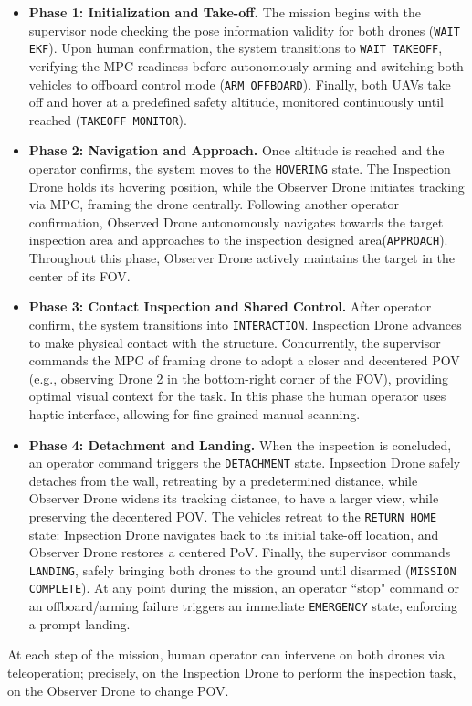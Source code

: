 \begin{itemize}
    \item \textbf{Phase 1: Initialization and Take-off.} The mission begins with the supervisor node checking the pose information validity for both drones (\texttt{WAIT EKF}). Upon human confirmation, the system transitions to \texttt{WAIT TAKEOFF}, verifying the MPC readiness before autonomously arming and switching both vehicles to offboard control mode (\texttt{ARM OFFBOARD}). Finally, both UAVs take off and hover at a predefined safety altitude, monitored continuously until reached (\texttt{TAKEOFF MONITOR}). 
    \item \textbf{Phase 2: Navigation and Approach.} Once altitude is reached and the operator confirms, the system moves to the \texttt{HOVERING} state. The Inspection Drone holds its hovering position, while the Observer Drone initiates tracking via MPC, framing the drone centrally. Following another operator confirmation, Observed Drone autonomously navigates towards the target inspection area and approaches to the inspection designed area(\texttt{APPROACH}). Throughout this phase, Observer Drone actively maintains the target in the center of its FOV.
    \item \textbf{Phase 3: Contact Inspection and Shared Control.} After operator confirm, the system transitions into \texttt{INTERACTION}. Inspection Drone advances to make physical contact with the structure. Concurrently, the supervisor commands the MPC of framing drone to adopt a closer and decentered POV (e.g., observing Drone 2 in the bottom-right corner of the FOV), providing optimal visual context for the task. In this phase the human operator uses haptic interface, allowing for fine-grained manual scanning.
    \item \textbf{Phase 4: Detachment and Landing.} When the inspection is concluded, an operator command triggers the \texttt{DETACHMENT} state. Inpsection Drone safely detaches from the wall, retreating by a predetermined distance, while Observer Drone widens its tracking distance, to have a larger view, while preserving the decentered POV. The vehicles retreat to the \texttt{RETURN HOME} state: Inpsection Drone navigates back to its initial take-off location, and Observer Drone restores a centered PoV. Finally, the supervisor commands \texttt{LANDING}, safely bringing both drones to the ground until disarmed (\texttt{MISSION COMPLETE}). At any point during the mission, an operator ``stop" command or an offboard/arming failure triggers an immediate \texttt{EMERGENCY} state, enforcing a prompt landing.
\end{itemize}
At each step of the mission, human operator can intervene on both drones via teleoperation; precisely, on the Inspection Drone to perform the inspection task, on the Observer Drone to change POV.

